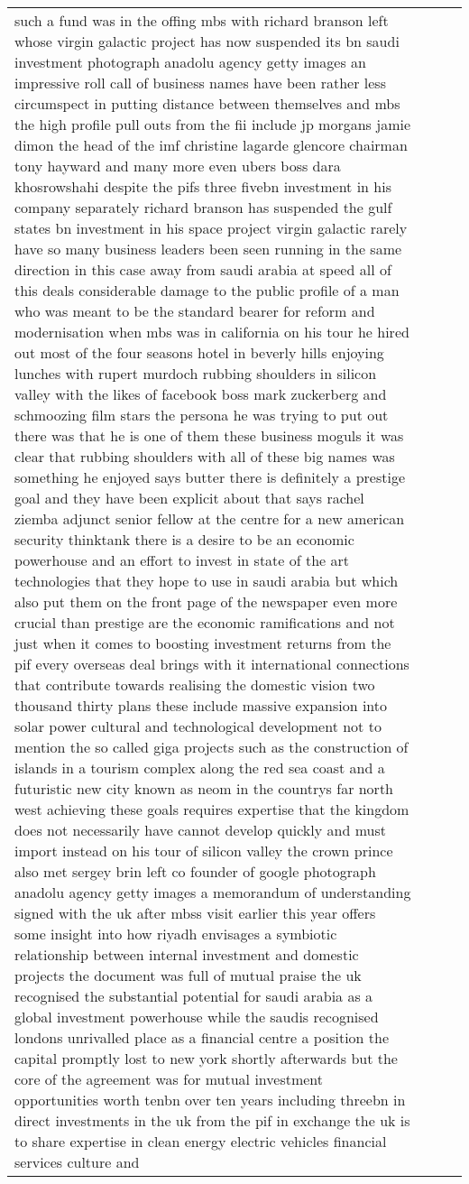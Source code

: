\documentclass[]{article}
\begin{document}
\begin{table}[!h]
{\begin{tabular}[t]{llll}
such a fund was in the offing mbs with richard branson left whose virgin galactic project has now suspended its bn saudi investment photograph anadolu agency getty images an impressive roll call of business names have been rather less circumspect in putting distance between themselves and mbs the high profile pull outs from the fii include jp morgans jamie dimon the head of the imf christine lagarde glencore chairman tony hayward and many more even ubers boss dara khosrowshahi despite the pifs three fivebn investment in his company separately richard branson has suspended the gulf states bn investment in his space project virgin galactic rarely have so many business leaders been seen running in the same direction in this case away from saudi arabia at speed all of this deals considerable damage to the public profile of a man who was meant to be the standard bearer for reform and modernisation when mbs was in california on his tour he hired out most of the four seasons hotel in beverly hills enjoying lunches with rupert murdoch rubbing shoulders in silicon valley with the likes of facebook boss mark zuckerberg and schmoozing film stars the persona he was trying to put out there was that he is one of them these business moguls it was clear that rubbing shoulders with all of these big names was something he enjoyed says butter there is definitely a prestige goal and they have been explicit about that says rachel ziemba adjunct senior fellow at the centre for a new american security thinktank there is a desire to be an economic powerhouse and an effort to invest in state of the art technologies that they hope to use in saudi arabia but which also put them on the front page of the newspaper even more crucial than prestige are the economic ramifications and not just when it comes to boosting investment returns from the pif every overseas deal brings with it international connections that contribute towards realising the domestic vision two thousand thirty plans these include massive expansion into solar power cultural and technological development not to mention the so called giga projects such as the construction of islands in a tourism complex along the red sea coast and a futuristic new city known as neom in the countrys far north west achieving these goals requires expertise that the kingdom does not necessarily have cannot develop quickly and must import instead on his tour of silicon valley the crown prince also met sergey brin left co founder of google photograph anadolu agency getty images a memorandum of understanding signed with the uk after mbss visit earlier this year offers some insight into how riyadh envisages a symbiotic relationship between internal investment and domestic projects the document was full of mutual praise the uk recognised the substantial potential for saudi arabia as a global investment powerhouse while the saudis recognised londons unrivalled place as a financial centre a position the capital promptly lost to new york shortly afterwards but the core of the agreement was for mutual investment opportunities worth tenbn over ten years including threebn in direct investments in the uk from the pif in exchange the uk is to share expertise in clean energy electric vehicles financial services culture and 
\end{tabular}}
\end{table}
\end{document}
